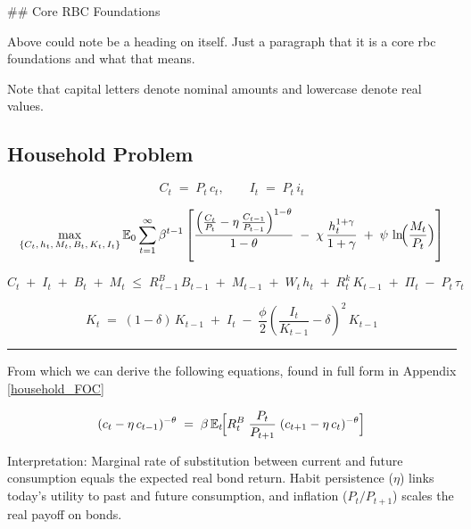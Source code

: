 \documentclass[11pt,preprint]{elsarticle}
\numberwithin{equation}{section}
\numberwithin{figure}{section}
\numberwithin{table}{section}
\begin{document}
\#\# Core RBC Foundations

Above could note be a heading on itself. Just a paragraph that it is a
core rbc foundations and what that means.

Note that capital letters denote nominal amounts and lowercase denote
real values.

\subsection{Household Problem}\label{household-problem}

\begin{equation}
C_t \;=\; P_t \, c_t,
\qquad
I_t \;=\; P_t \, i_t
\label{nominal_definitions}
\end{equation}

\begin{equation}
\max_{\{C_t,\,h_t,\,M_t,\,B_t,\,K_t,\,I_t\}}
\mathbb{E}_0 \sum_{t=1}^{\infty} \beta^{t-1}
\left[
\frac{\Bigl(\frac{C_t}{P_t} - \eta\,\frac{C_{t-1}}{P_{t-1}}\Bigr)^{1-\theta}}{1-\theta}
\;-\;\chi\,\frac{h_t^{1+\gamma}}{1+\gamma}
\;+\;\psi\,\ln\!\Bigl(\frac{M_t}{P_t}\Bigr)
\right]
\label{lifetime_utility_nominal}
\end{equation}

\begin{equation}
C_t \;+\; I_t \;+\; B_t \;+\; M_t
\;\le\;
R^B_{\,t-1}\,B_{t-1}
\;+\; M_{t-1}
\;+\; W_t\,h_t
\;+\; R^k_t\,K_{t-1}
\;+\; \Pi_t
\;-\; P_t\,\tau_t
\label{flow_constraint_nominal}
\end{equation}

\begin{equation}
K_t
\;=\;
(1 - \delta)\,K_{t-1}
\;+\; I_t
\;-\;\frac{\phi}{2}
\left(\frac{I_t}{K_{t-1}} - \delta\right)^{2}
\,K_{t-1}
\label{capital_accumulation_nominal}
\end{equation}

\begin{center}\rule{0.5\linewidth}{0.5pt}\end{center}

From which we can derive the following equations, found in full form in
Appendix \ref{household_FOC}

\begin{equation}\label{consEuler}
  (c_t - \eta\,c_{t-1})^{-\theta}
  \;=\;
  \beta\,\mathbb{E}_t\!\Bigl[
    R_t^B \;\frac{P_t}{P_{t+1}}\;(c_{t+1} - \eta\,c_t)^{-\theta}
  \Bigr]
\end{equation}

Interpretation: Marginal rate of substitution between current and future
consumption equals the expected real bond return. Habit persistence
(\(\eta\)) links today's utility to past and future consumption, and
inflation (\(P_t/P_{t+1}\)) scales the real payoff on bonds.
\end{document}
